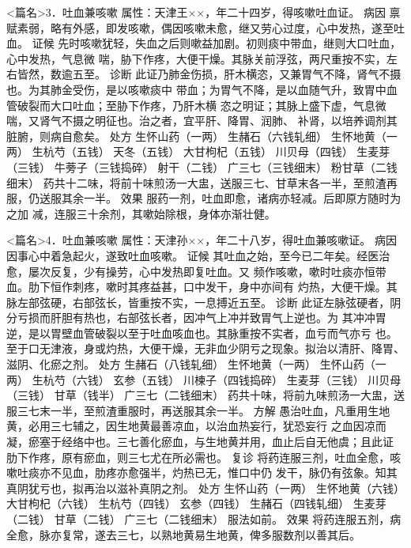 \documentclass[a4paper,12pt,UTF8,twoside]{ctexbook}
\begin{document}
<篇名>3．吐血兼咳嗽
属性：天津王××，年二十四岁，得咳嗽吐血证。 
病因 禀赋素弱，略有外感，即发咳嗽，偶因咳嗽未愈，继又劳心过度，心中发热，遂至吐血。 
证候 先时咳嗽犹轻，失血之后则嗽益加剧。初则痰中带血，继则大口吐血，心中发热，气息微 
喘，胁下作疼，大便干燥。其脉关前浮弦，两尺重按不实，左右皆然，数逾五至。 
诊断 此证乃肺金伤损，肝木横恣，又兼胃气不降，肾气不摄也。为其肺金受伤，是以咳嗽痰中 
带血；为胃气不降，是以血随气升，致胃中血管破裂而大口吐血；至胁下作疼，乃肝木横 
恣之明证；其脉上盛下虚，气息微喘，又肾气不摄之明征也。治之者，宜平肝、降胃、润肺、 
补肾，以培养调剂其脏腑，则病自愈矣。 
处方 生怀山药（一两） 生赭石（六钱轧细） 生怀地黄（一两） 生杭芍（五钱） 
天冬（五钱） 大甘枸杞（五钱） 川贝母（四钱） 生麦芽（三钱） 
牛蒡子（三钱捣碎） 射干（二钱） 广三七（三钱细末） 粉甘草（二钱细末） 
药共十二味，将前十味煎汤一大盅，送服三七、甘草末各一半，至煎渣再服，仍送服其余一半。 
效果 服药一剂，吐血即愈，诸病亦轻减。后即原方随时为之加 
减，连服三十余剂，其嗽始除根，身体亦渐壮健。 


<篇名>4．吐血兼咳嗽
属性：天津孙××，年二十八岁，得吐血兼咳嗽证。 
病因 因事心中着急起火，遂致吐血咳嗽。 
证候 其吐血之始，至今已二年矣。经医治愈，屡次反复，少有操劳，心中发热即复吐血。又 
频作咳嗽，嗽时吐痰亦恒带血。肋下恒作刺疼，嗽时其疼益甚，口中发干，身中亦间有 
灼热，大便干燥。其脉左部弦硬，右部弦长，皆重按不实，一息搏近五至。 
诊断 此证左脉弦硬者，阴分亏损而肝胆有热也，右部弦长者，因冲气上冲并致胃气上逆也。为 
其冲冲胃逆，是以胃壁血管破裂以至于吐血咳血也。其脉重按不实者，血亏而气亦亏 
也。至于口无津液，身或灼热，大便干燥，无非血少阴亏之现象。拟治以清肝、降胃、滋阴、化瘀之剂。 
处方 生赭石（八钱轧细） 生怀地黄（一两） 生怀山药（一两） 生杭芍（六钱） 
玄参（五钱） 川楝子（四钱捣碎） 生麦芽（三钱） 川贝母（三钱） 甘草（钱半） 广三七（二钱细末） 
药共十味，将前九味煎汤一大盅，送服三七末一半，至煎渣重服时，再送服其余一半。 
方解 愚治吐血，凡重用生地黄，必用三七辅之，因生地黄最善凉血，以治血热妄行，犹恐妄行 
之血因凉而凝，瘀塞于经络中也。三七善化瘀血，与生地黄并用，血止后自无他虞；且此证 
肋下作疼，原有瘀血，则三七尤在所必需也。 
复诊 将药连服三剂，吐血全愈，咳嗽吐痰亦不见血，肋疼亦愈强半，灼热已无，惟口中仍 
发干，脉仍有弦象。知其真阴犹亏也，拟再治以滋补真阴之剂。 
处方 生怀山药（一两） 生怀地黄（六钱） 大甘枸杞（六钱） 生杭芍（四钱） 
玄参（四钱） 生赭石（四钱轧细） 生麦芽（二钱） 甘草（二钱） 广三七（二钱细末） 
服法如前。 
效果 将药连服五剂，病全愈，脉亦复常，遂去三七，以熟地黄易生地黄，俾多服数剂以善其后。 
\end{document}
